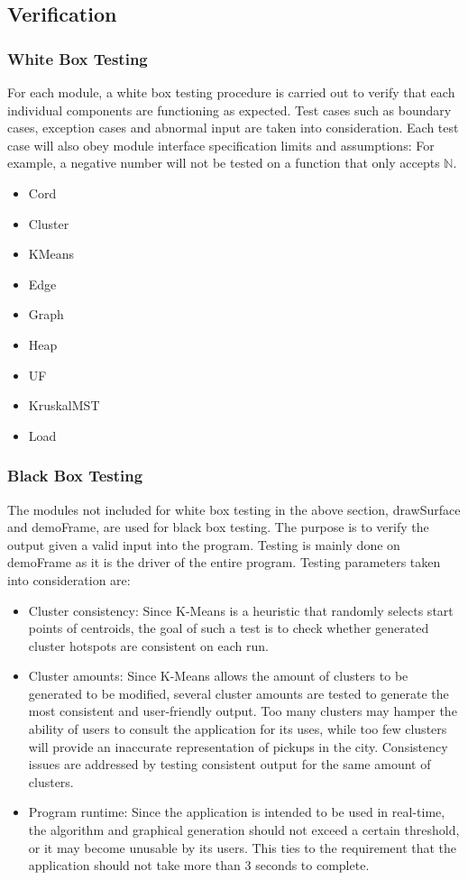 \documentclass[12pt]{article}
\begin{document}
\subsection{Verification}
\subsubsection{White Box Testing}
For each module, a white box testing procedure is carried out to verify that each
individual components are functioning as expected. Test cases such as boundary 
cases, exception cases and abnormal input are taken into consideration. Each test
case will also obey module interface specification limits and assumptions: For example,
a negative number will not be tested on a function that only accepts $\mathbb{N}$.

\begin{itemize}
\item Cord
\item Cluster
\item KMeans
\item Edge
\item Graph
\item Heap
\item UF
\item KruskalMST
\item Load
\end{itemize}

\newpage

\subsubsection{Black Box Testing}
The modules not included for white box testing in the above section, drawSurface and demoFrame,
are used for black box testing. The purpose is to verify the output given a valid input into
the program. Testing is mainly done on demoFrame as it is the driver of the entire program.
Testing parameters taken into consideration are:

\begin{itemize}
\item Cluster consistency: Since K-Means is a heuristic that randomly selects start points of centroids,
the goal of such a test is to check whether generated cluster hotspots are consistent on each run.
\item Cluster amounts: Since K-Means allows the amount of clusters to be generated to be modified,
several cluster amounts are tested to generate the most consistent and user-friendly output. Too many
clusters may hamper the ability of users to consult the application for its uses, while too few clusters
will provide an inaccurate representation of pickups in the city. Consistency issues are addressed by
testing consistent output for the same amount of clusters.
\item Program runtime: Since the application is intended to be used in real-time, the algorithm and graphical
generation should not exceed a certain threshold, or it may become unusable by its users. This ties to
the requirement that the application should not take more than 3 seconds to complete.
\end{itemize}
\end{document}
